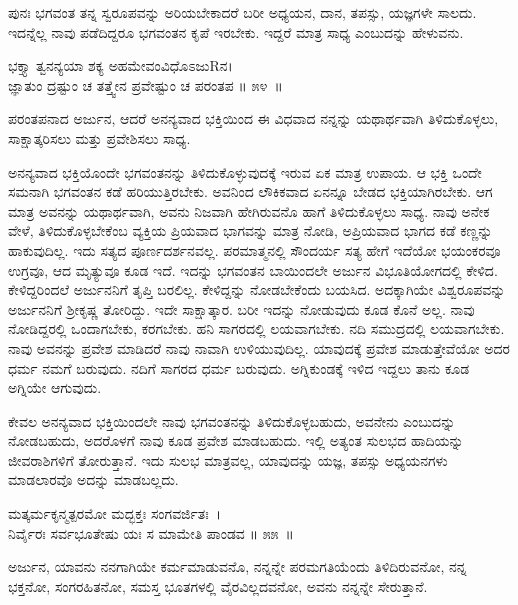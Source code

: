 ಪುನಃ ಭಗವಂತ ತನ್ನ ಸ್ವರೂಪವನ್ನು ಅರಿಯಬೇಕಾದರೆ ಬರೀ ಅಧ್ಯಯನ, ದಾನ, ತಪಸ್ಸು, ಯಜ್ಞಗಳೇ ಸಾಲದು. ಇದನ್ನೆಲ್ಲ ನಾವು ಪಡೆದಿದ್ದರೂ ಭಗವಂತನ ಕೃಪೆ ಇರಬೇಕು. ಇದ್ದರೆ ಮಾತ್ರ ಸಾಧ್ಯ ಎಂಬುದನ್ನು ಹೇಳುವನು.

\begin{shloka}
ಭಕ್ತ್ಯಾ ತ್ವನನ್ಯಯಾ ಶಕ್ಯ ಅಹಮೇವಂವಿಧೊಽಜುRನ।\\ಜ್ಞಾತುಂ ದ್ರಷ್ಟುಂ ಚ ತತ್ತ್ವೇನ ಪ್ರವೇಷ್ಟುಂ ಚ ಪರಂತಪ \hfill॥ ೫೪~॥
\end{shloka}

\begin{artha}
ಪರಂತಪನಾದ ಅರ್ಜುನ, ಆದರೆ ಅನನ್ಯವಾದ ಭಕ್ತಿಯಿಂದ ಈ ವಿಧವಾದ ನನ್ನನ್ನು ಯಥಾರ್ಥವಾಗಿ ತಿಳಿದುಕೊಳ್ಳಲು, ಸಾಕ್ಷಾತ್ಕರಿಸಲು ಮತ್ತು ಪ್ರವೇಶಿಸಲು ಸಾಧ್ಯ.
\end{artha}

ಅನನ್ಯವಾದ ಭಕ್ತಿಯೊಂದೇ ಭಗವಂತನನ್ನು ತಿಳಿದುಕೊಳ್ಳುವುದಕ್ಕೆ ಇರುವ ಏಕ ಮಾತ್ರ ಉಪಾಯ. ಆ ಭಕ್ತಿ ಒಂದೇ ಸಮನಾಗಿ ಭಗವಂತನ ಕಡೆ ಹರಿಯುತ್ತಿರಬೇಕು. ಅವನಿಂದ ಲೌಕಿಕವಾದ ಏನನ್ನೂ ಬೇಡದ ಭಕ್ತಿಯಾಗಿರಬೇಕು. ಆಗ ಮಾತ್ರ ಅವನನ್ನು ಯಥಾರ್ಥವಾಗಿ, ಅವನು ನಿಜವಾಗಿ ಹೇಗಿರುವನೊ ಹಾಗೆ ತಿಳಿದುಕೊಳ್ಳಲು ಸಾಧ್ಯ. ನಾವು ಅನೇಕ ವೇಳೆ, ತಿಳಿದುಕೊಳ್ಳಬೇಕೆಂಬ ವ್ಯಕ್ತಿಯ ಪ್ರಿಯವಾದ ಭಾಗವನ್ನು ಮಾತ್ರ ನೋಡಿ, ಅಪ್ರಿಯವಾದ ಭಾಗದ ಕಡೆ ಕಣ್ಣನ್ನು ಹಾಕುವುದಿಲ್ಲ. ಇದು ಸತ್ಯದ ಪೂರ್ಣದರ್ಶನವಲ್ಲ. ಪರಮಾತ್ಮನಲ್ಲಿ ಸೌಂದರ್ಯ ಸತ್ಯ ಹೇಗೆ ಇದೆಯೋ ಭಯಂಕರವೂ ಉಗ್ರವೂ, ಆದ ಮೃತ್ಯುವೂ ಕೂಡ ಇದೆ. ಇದನ್ನು ಭಗವಂತನ ಬಾಯಿಂದಲೇ ಅರ್ಜುನ ವಿಭೂತಿಯೋಗದಲ್ಲಿ ಕೇಳಿದ. ಕೇಳಿದ್ದರಿಂದಲೆ ಅರ್ಜುನನಿಗೆ ತೃಪ್ತಿ ಬರಲಿಲ್ಲ. ಕೇಳಿದ್ದನ್ನು ನೋಡಬೇಕೆಂದು ಬಯಸಿದ. ಅದಕ್ಕಾಗಿಯೇ ವಿಶ್ವರೂಪವನ್ನು ಅರ್ಜುನನಿಗೆ ಶ‍್ರೀಕೃಷ್ಣ ತೋರಿದ್ದು. ಇದೇ ಸಾಕ್ಷಾತ್ಕಾರ. ಬರೀ ಇದನ್ನು ನೋಡುವುದು ಕೂಡ ಕೊನೆ ಅಲ್ಲ. ನಾವು ನೋಡಿದ್ದರಲ್ಲಿ ಒಂದಾಗಬೇಕು, ಕರಗಬೇಕು. ಹನಿ ಸಾಗರದಲ್ಲಿ ಲಯವಾಗಬೇಕು. ನದಿ ಸಮುದ್ರದಲ್ಲಿ ಲಯವಾಗಬೇಕು. ನಾವು ಅವನನ್ನು ಪ್ರವೇಶ ಮಾಡಿದರೆ ನಾವು ನಾವಾಗಿ ಉಳಿಯುವುದಿಲ್ಲ. ಯಾವುದಕ್ಕೆ ಪ್ರವೇಶ ಮಾಡುತ್ತೇವೆಯೋ ಅದರ ಧರ್ಮ ನಮಗೆ ಬರುವುದು. ನದಿಗೆ ಸಾಗರದ ಧರ್ಮ ಬರುವುದು. ಅಗ್ನಿಕುಂಡಕ್ಕೆ ಇಳಿದ ಇದ್ದಲು ತಾನು ಕೂಡ ಅಗ್ನಿಯೇ ಆಗುವುದು.

ಕೇವಲ ಅನನ್ಯವಾದ ಭಕ್ತಿಯಿಂದಲೇ ನಾವು ಭಗವಂತನನ್ನು ತಿಳಿದುಕೊಳ್ಳಬಹುದು, ಅವನೇನು ಎಂಬುದನ್ನು ನೋಡಬಹುದು, ಅದರೊಳಗೆ ನಾವು ಕೂಡ ಪ್ರವೇಶ ಮಾಡಬಹುದು. ಇಲ್ಲಿ ಅತ್ಯಂತ ಸುಲಭದ ಹಾದಿಯನ್ನು ಜೀವರಾಶಿಗಳಿಗೆ ತೋರುತ್ತಾನೆ. ಇದು ಸುಲಭ ಮಾತ್ರವಲ್ಲ, ಯಾವುದನ್ನು ಯಜ್ಞ, ತಪಸ್ಸು ಅಧ್ಯಯನಗಳು ಮಾಡಲಾರವೊ ಅದನ್ನು ಮಾಡಬಲ್ಲದು.

\begin{shloka}
ಮತ್ಕರ್ಮಕೃನ್ಮತ್ಪರಮೋ ಮದ್ಭಕ್ತಃ ಸಂಗವರ್ಜಿತಃ~।\\ನಿರ್ವೈರಃ ಸರ್ವಭೂತೇಷು ಯಃ ಸ ಮಾಮೇತಿ ಪಾಂಡವ \hfill॥ ೫೫~॥
\end{shloka}

\begin{artha}
ಅರ್ಜುನ, ಯಾವನು ನನಗಾಗಿಯೇ ಕರ್ಮಮಾಡುವನೊ, ನನ್ನನ್ನೇ ಪರಮಗತಿಯೆಂದು ತಿಳಿದಿರು\-ವನೋ, ನನ್ನ ಭಕ್ತನೋ, ಸಂಗರಹಿತನೋ, ಸಮಸ್ತ ಭೂತಗಳಲ್ಲಿ ವೈರವಿಲ್ಲದವನೋ, ಅವನು ನನ್ನನ್ನೇ ಸೇರುತ್ತಾನೆ.
\end{artha}

